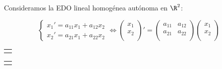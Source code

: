 Consideramos la EDO lineal homogénea autónoma en $\R^2$:

\begin{equation}
\left\{\begin{array}{rl}
x_1'=a_{11}x_1+a_{12}x_2 \\
x_2'=a_{21}x_1+a_{22}x_2
\end{array}\right.\Leftrightarrow
\begin{pmatrix}
x_1 \\
x_2 \\
\end{pmatrix}
'=
\begin{pmatrix}
a_{11} & a_{12} \\
a_{21} & a_{22} \\
\end{pmatrix}
\begin{pmatrix}
x_1 \\
x_2 \\
\end{pmatrix}
\end{equation}


\newcommand\newtemplate[4][0.4]%
 {\newsavebox#2%
   \savebox#2%
   {\begin{tabular}{@{}c@{}}
      \\[2#1ex]
      \begin{tikzpicture}[scale=#1]
      #4
      \end{tikzpicture}\\[4#1ex]
     \end{tabular}%
   }%
 }
\newcommand\template[1]{\usebox{#1}}             %
\newcommand\templatecaption[1]{{\sffamily\scriptsize#1}}       %
\newcommand\Tr{\mathop{\mathrm{tr}}}

\newtemplate\sink{sink}%
 {\foreach \sx in {+,-}                   %
   {\draw[flow] (\sx4,0) -- (0,0);        %
    \draw[flow] (0,\sx4) -- (0,0);        %
    \foreach \sy in {+,-}                 %
      \foreach \a/\b in {2/1,3/0.44}      %
        \draw[flow,domain=\sx\a:0] plot (\x, {\sy\b*\x*\x});
   }
 }

\newtemplate\source{source}%
 {\foreach \sx in {+,-}                   %
   {\draw[flow] (0,0) -- (\sx4,0);        %
    \draw[flow] (0,0) -- (0,\sx4);        %
    \foreach \sy in {+,-}                 %
      \foreach \a/\b in {2/1,3/0.44}      %
        \draw[flow,domain=0:\sx\a] plot (\x, {\sy\b*\x*\x});
   }
 }

